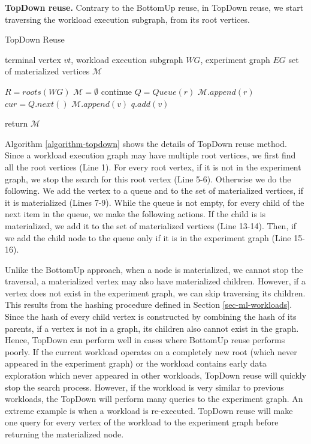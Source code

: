 \textbf{TopDown reuse.}
Contrary to the BottomUp reuse, in TopDown reuse, we start traversing the workload execution subgraph, from its root vertices.
\begin{algorithm}[h]
\caption{TopDown Reuse}\label{algorithm-topdown}
\begin{algorithmic}[1]
\Require terminal vertex $vt$, workload execution subgraph  $WG$, experiment graph $EG$ 
\Ensure set of materialized vertices $\mathcal{M}$ 

\State $R=roots(WG)$
\State $\mathcal{M} = \emptyset$
		\State continue 
	\EndIf
	\State $Q = Queue(r)$  
		 \State	 $\mathcal{M}.append(r)$
	\EndIf
			\State $cur = Q.next()$
					\State	$\mathcal{M}.append(v)$
				\EndIf
					\State $q.add(v)$
				\EndIf
			\EndFor
		\EndWhile

\EndFor
\State return $\mathcal{M}$
\end{algorithmic}
\end{algorithm}
Algorithm \ref{algorithm-topdown} shows the details of TopDown reuse method.
Since a workload execution graph may have multiple root vertices, we first find all the root vertices (Line 1).
For every root vertex, if it is not in the experiment graph, we stop the search for this root vertex (Line 5-6).
Otherwise we do the following.
We add the vertex to a queue and to the set of materialized vertices, if it is materialized (Lines 7-9).
While the queue is not empty, for every child of the next item in the queue, we make the following actions.
If the child is is materialized, we add it to the set of materialized vertices (Line 13-14).
Then, if we add the child node to the queue only if it is in the experiment graph (Line 15-16).

Unlike the BottomUp approach, when a node is materialized, we cannot stop the traversal, a materialized vertex may also have materialized children.
However, if a vertex does not exist in the experiment graph, we can skip traversing its children.
This results from the hashing procedure defined in Section \ref{sec-ml-workloads}.
Since the hash of every child vertex is constructed by combining the hash of its parents, if a vertex is not in a graph, its children also cannot exist in the graph.
Hence, TopDown can perform well in cases where BottomUp reuse performs poorly.
If the current workload operates on a completely new root (which never appeared in the experiment graph) or the workload contains early data exploration which never appeared in other workloads, TopDown reuse will quickly stop the search process.
However, if the workload is very similar to previous workloads, the TopDown will perform many queries to the experiment graph.
An extreme example is when a workload is re-executed.
TopDown reuse will make one query for every vertex of the workload to the experiment graph before returning the materialized node.

